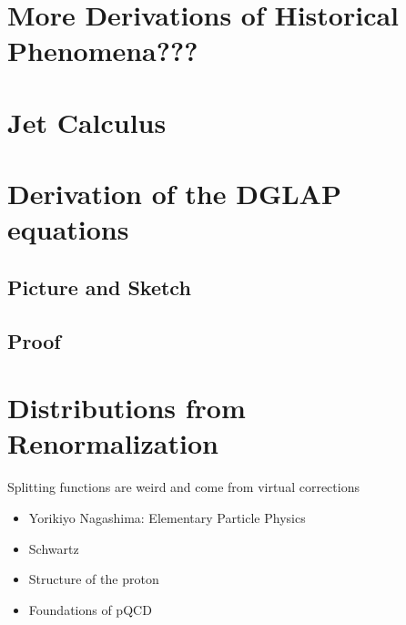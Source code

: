 \begin{subappendices}
\section{More Derivations of Historical Phenomena???}


\section{Jet Calculus}


\section{Derivation of the DGLAP equations}

\subsection{Picture and Sketch}

\subsection{Proof}



\section{Distributions from Renormalization}
Splitting functions are weird and come from virtual corrections

\begin{itemize}
    \item
        Yorikiyo Nagashima: Elementary Particle Physics

    \item
        Schwartz
    \item
        Structure of the proton
    \item
        Foundations of pQCD
\end{itemize}


\end{subappendices}
